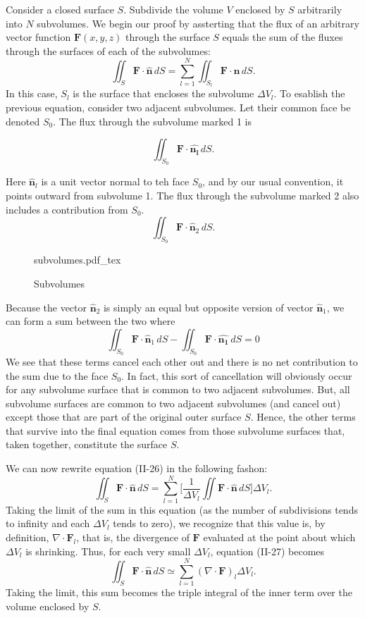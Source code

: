 \documentclass[11pt]{article}
\newcommand{\incfig}[2][1]{%
    \def\svgwidth{#1\columnwidth}
    {#2.pdf_tex}
}
\begin{document}
Consider a closed surface $S$. Subdivide the volume $V$ enclosed by $S$ arbitrarily into $N$ subvolumes. We begin our proof by assterting that the flux of an arbitrary vector function $\mathbf{F} (x,y,z)$ through the surface $S$ equals the sum of the fluxes through the surfaces of each of the subvolumes:
\[
	\iint_S \mathbf{F} \cdot \mathbf{\hat{n}} \, dS = \sum_{l=1}^{N} \iint_{S_l} \mathbf{F} \cdot \mathbf{\hat{n}} \, dS \tag{II-26}
.\]
In this case, $S_l$ is the surface that encloses the subvolume $\Delta V_l$. To esablish the previous equation, consider two adjacent subvolumes. Let their common face be denoted $S_0$. The flux through the subvolume marked 1 is

\[
	\iint_{S_0} \mathbf{F} \cdot \mathbf{\hat{n_l}} \, dS
.\]

Here $\mathbf{\hat{n}}_l$ is a unit vector normal to teh face $S_0$, and by our usual convention, it points outward from subvolume 1. The flux through the subvolume marked 2 also includes a contribution from $S_0$.
\[
	\iint_{S_0} \mathbf{F} \cdot \mathbf{\hat{n}}_2 \, dS
.\]
\begin{figure}[ht]
    \centering
    \incfig{subvolumes}
    \caption{Subvolumes}
    \label{fig:Subvolumes}
\end{figure}

Because the vector $\mathbf{\hat{n}}_2$ is simply an equal but opposite version of vector $\mathbf{\hat{n}}_1$, we can form a sum between the two where
\[
	\iint_{S_0} \mathbf{F} \cdot \mathbf{\hat{n}}_1 \, dS - \iint_{S_0} \mathbf{F} \cdot \mathbf{\hat{n_1}} \, dS = 0
\]
We see that these terms cancel each other out and there is no net contribution to the sum due to the face $S_0$. In fact, this sort of cancellation will obviously occur for any subvolume surface that is common to two adjacent subvolumes. But, all subvolume surfaces are common to two adjacent subvolumes (and cancel out) except those that are part of the original outer surface $S$. Hence, the other terms that survive into the final equation comes from those subvolume surfaces that, taken together, constitute the surface $S$.

We can now rewrite equation (II-26) in the following fashon:
\[
	\iint_S \mathbf{F} \cdot \mathbf{\hat{n}} \, dS = \sum_{l=1}^N \biggl[\frac{1}{\Delta V_l} \iint \mathbf{F} \cdot \mathbf{\hat{n}} \, dS\biggr] \Delta V_l \tag{II-27}
.\]
Taking the limit of the sum in this equation (as the number of subdivisions tends to infinity and each $\Delta V_l$ tends to zero), we recognize that this value is, by definition, $\nabla \cdot \mathbf{F}_l$, that is, the divergence of $\mathbf{F}$ evaluated at the point about which $\Delta V_l$ is shrinking. Thus, for each very small $\Delta V_l$, equation (II-27) becomes
\[
	\iint_S \mathbf{F} \cdot \mathbf{\hat{n}} \, dS \simeq \sum_{l=1}^N (\nabla \cdot \mathbf{F})_l \Delta V_l
.\]
Taking the limit, this sum becomes the triple integral of the inner term over the volume enclosed by $S$.
\end{document}
